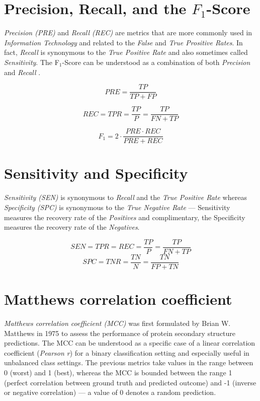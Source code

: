 \documentclass{article}
\begin{document}
\section{Precision, Recall, and the $F_1$-Score}

\emph{Precision (PRE)} and \emph{Recall (REC)} are metrics that are more commonly used in \emph{Information Technology} and related to the \emph {False} and \emph{True Prositive Rates}. In fact, \emph{Recall} is synonymous to the \emph{True Positive Rate} and also sometimes called \emph{Sensitivity}. The F$_1$-Score can be understood as a combination of both \emph{Precision} and \emph{Recall} \cite{goutte2005probabilistic}.

\begin{equation} PRE = \frac{TP}{TP + FP} \end{equation}

\begin{equation} REC = TPR = \frac{TP}{P} =  \frac{TP}{FN + TP} \end{equation}

\begin{equation} F_1 = 2 \cdot \frac{PRE \cdot REC}{PRE + REC}\end{equation}





\section{Sensitivity and Specificity}

\emph{Sensitivity (SEN)} is synonymous to \emph{Recall} and the \emph{True Positive Rate} whereas \emph{Specificity (SPC)} is synonymous to the \emph{True Negative Rate} --- Sensitivity measures the recovery rate of the \emph{Positives} and complimentary, the Specificity  measures the recovery rate of the \emph{Negatives}.

\begin{equation} SEN = TPR = REC = \frac{TP}{P} =  \frac{TP}{FN + TP} \end{equation}
\begin{equation} SPC = TNR =\frac{TN}{N} =  \frac{TN}{FP + TN} \end{equation}

\section{Matthews correlation coefficient}

\emph{Matthews correlation coefficient (MCC)} was first formulated by Brian W. Matthews \cite{matthews1975comparison} in 1975 to assess the performance of protein secondary structure predictions. The MCC can be understood as a specific case of a linear correlation coefficient (\emph{Pearson r}) for a binary classification setting and especially useful in unbalanced class settings.
The previous metrics take values in the range between 0 (worst) and 1 (best), whereas the MCC is bounded between the range 1 (perfect correlation between ground truth and predicted outcome) and -1 (inverse or negative correlation) --- a value of 0 denotes a random prediction. 
\end{document}
